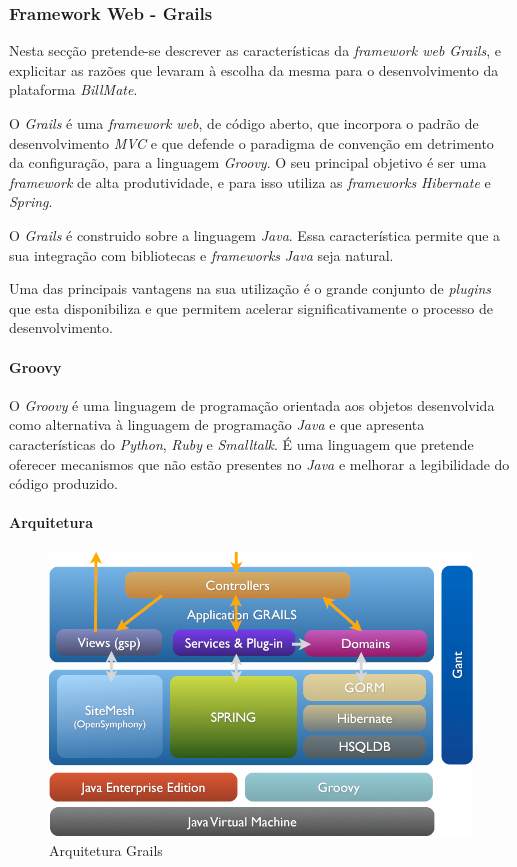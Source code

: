 \subsubsection{Framework Web - Grails} 

\newline

Nesta secção pretende-se descrever as características da \textit{framework web Grails}, e explicitar as razões que levaram à escolha da mesma para o desenvolvimento da plataforma \textit{BillMate}.

O \textit{Grails} é uma \textit{framework web}, de código aberto, que incorpora o padrão de desenvolvimento \textit{MVC} e que defende o paradigma de convenção em detrimento da configuração, para a linguagem \textit{Groovy}. O seu principal objetivo é ser uma \textit{framework} de alta produtividade, e para isso utiliza as \textit{frameworks} \textit{Hibernate} e \textit{Spring}. 

O \textit{Grails} é construido sobre a linguagem \textit{Java}. Essa característica permite que a sua integração com bibliotecas e \textit{frameworks} \textit{Java} seja natural.

Uma das principais vantagens na sua utilização é o grande conjunto de \textit{plugins} que esta disponibiliza e que permitem acelerar significativamente o processo de desenvolvimento.

\paragraph{Groovy}

O \textit{Groovy} é uma linguagem de programação orientada aos objetos desenvolvida como alternativa à linguagem de programação \textit{Java} e que apresenta características do \textit{Python}, \textit{Ruby} e \textit{Smalltalk}. É uma linguagem que pretende oferecer mecanismos que não estão presentes no \textit{Java} e melhorar a legibilidade do código produzido.

\paragraph{Arquitetura}

\begin{figure}[ht]
\centerline{\includegraphics[width=.5\textwidth]{images/implementation/architecture_grails}}
\caption{Arquitetura Grails}
\end{figure}

